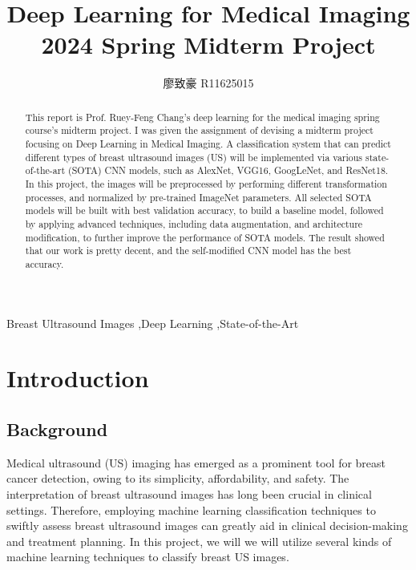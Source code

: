 \documentclass[final,5p,times,twocolumn,sort&compress]{elsarticle}
\begin{document}
\begin{frontmatter}

    \title{Deep Learning for Medical Imaging 2024 Spring Midterm Project}
    \author[1,2]{廖致豪 R11625015}
    \address[1]{National Taiwan University, School of Forestry and Resource Conservation, Taipei, Taiwan}
    \address[2]{National Taiwan University, Graduate Institute of Biomedical Electronics and Bioinformatics, Taipei, Taiwan}

    \begin{abstract}
        This report is Prof. Ruey-Feng Chang's deep learning for the medical imaging spring course's midterm project. I was given the assignment of devising a midterm project focusing on Deep Learning in Medical Imaging. A classification system that can predict different types of breast ultrasound images (US) will be implemented via various state-of-the-art (SOTA) CNN models, such as AlexNet, VGG16, GoogLeNet, and ResNet18. In this project, the images will be preprocessed by performing different transformation processes, and normalized by pre-trained ImageNet parameters. All selected SOTA models will be built with best validation accuracy, to build a baseline model, followed by applying advanced techniques, including data augmentation, and architecture modification, to further improve the performance of SOTA models. The result showed that our work is pretty decent, and the self-modified CNN model has the best accuracy.
    \end{abstract}

    \begin{keyword}
        Breast Ultrasound Images \sep  Deep Learning \sep  State-of-the-Art
    \end{keyword}

\end{frontmatter}

\section{Introduction}
\label{introduction}
\subsection{Background}
Medical ultrasound (US) imaging has emerged as a prominent tool for breast cancer detection, owing to its simplicity, affordability, and safety. The interpretation of breast ultrasound images has long been crucial in clinical settings. Therefore, employing machine learning classification techniques to swiftly assess breast ultrasound images can greatly aid in clinical decision-making and treatment planning. In this project, we will we will utilize several kinds of machine learning techniques to classify breast US images.
\end{document}
